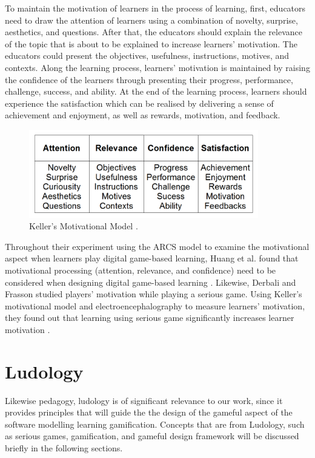 \documentclass[12pt, a4paper]{report}
\begin{document}
To maintain the motivation of learners in the process of learning, first, educators need to draw the attention of learners using a combination of novelty, surprise, aesthetics, and questions. After that, the educators should explain the relevance of the topic that is about to be explained to increase learners' motivation. The educators could present the objectives, usefulness, instructions, motives, and contexts. Along the learning process, learners' motivation is maintained by raising the confidence of the learners through presenting their progress, performance, challenge, success, and ability. At the end of the learning process, learners should experience the satisfaction which can be realised by delivering a sense of achievement and enjoyment, as well as rewards, motivation, and feedback.

\begin{figure}[ht]
\centering
\includegraphics[width=10cm]{keller}
\caption{Keller's Motivational Model \cite{keller2010motivational}.}
\label{keller}
\end{figure}

Throughout their experiment using the ARCS model to examine the motivational aspect when learners play digital game-based learning, Huang et al. found that motivational processing (attention, relevance, and confidence) need to be considered when designing digital game-based learning \cite{huang2010sustaining}. Likewise, Derbali and Frasson studied players' motivation while playing a serious game. Using Keller's motivational model and electroencephalography to measure learners' motivation, they found out that learning using serious game significantly increases learner motivation \cite{derbali2010players}. 

\section{Ludology}
Likewise pedagogy, ludology is of significant relevance to our work, since it provides principles that will guide the the design of the gameful aspect of the software modelling learning gamification. Concepts that are from Ludology, such as serious games, gamification, and gameful design framework \cite{deterding2015lens} will be discussed briefly in the following sections.   
\end{document}
